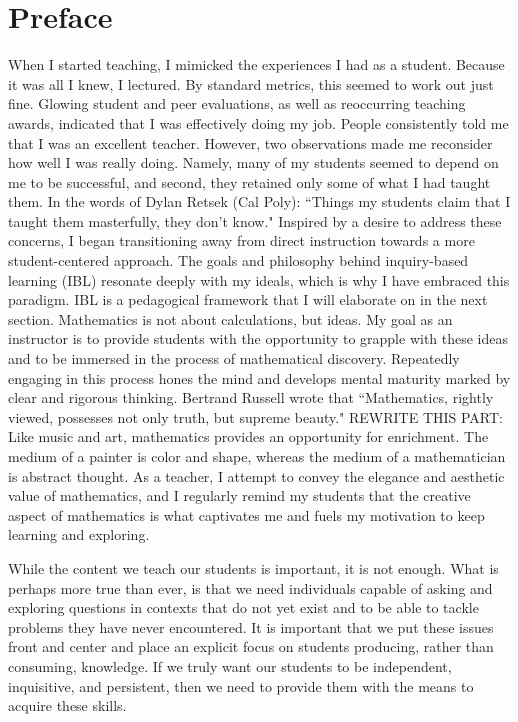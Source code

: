 \chapter*{Preface}


When I started teaching, I mimicked the experiences I had as a student. Because it was all I knew, I lectured. By standard metrics, this seemed to work out just fine. Glowing student and peer evaluations, as well as reoccurring teaching awards, indicated that I was effectively doing my job. People consistently told me that I was an excellent teacher. However, two observations made me reconsider how well I was really doing. Namely, many of my students seemed to depend on me to be successful, and second, they retained only some of what I had taught them. In the words of Dylan Retsek (Cal Poly):
``Things my students claim that I taught them masterfully, they don't know."
Inspired by a desire to address these concerns, I began transitioning away from direct instruction towards a more student-centered approach. The goals and philosophy behind inquiry-based learning (IBL) resonate deeply with my ideals, which is why I have embraced this paradigm. IBL is a pedagogical framework that I will elaborate on in the next section.
Mathematics is not about calculations, but ideas. My goal as an instructor is to provide students with the opportunity to grapple with these ideas and to be immersed in the process of mathematical discovery. Repeatedly engaging in this process hones the mind and develops mental maturity marked by clear and rigorous thinking. Bertrand Russell wrote that
``Mathematics, rightly viewed, possesses not only truth, but supreme beauty."
REWRITE THIS PART: Like music and art, mathematics provides an opportunity for enrichment. The medium of a painter is color and shape, whereas the medium of a mathematician is abstract thought. As a teacher, I attempt to convey the elegance and aesthetic value of mathematics, and I regularly remind my students that the creative aspect of mathematics is what captivates me and fuels my motivation to keep learning and exploring.

While the content we teach our students is important, it is not enough. What is perhaps more true than ever, is that we need individuals capable of asking and exploring questions in contexts that do not yet exist and to be able to tackle problems they have never encountered. It is important that we put these issues front and center and place an explicit focus on students producing, rather than consuming, knowledge. If we truly want our students to be independent, inquisitive, and persistent, then we need to provide them with the means to acquire these skills.


